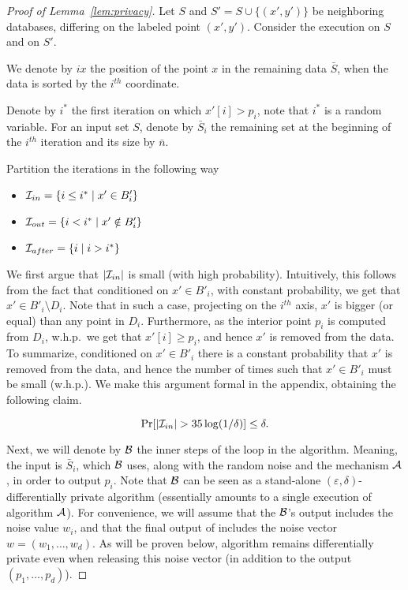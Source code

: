 \documentclass[12pt,a4paper,oneside,onecolumn]{book}
\begin{document}
\begin{proof}[Proof of Lemma~\ref{lem:privacy}]

  Let $S$ and $S'=S\cup\{(x',y')\}$ be neighboring databases, differing on the labeled point $(x',y')$. Consider the execution on $S$ and on $S'$.
  
We denote by $\num{i}{x}$ the position of the point $x$ in the remaining data $\bar{S}$,
when the data is sorted by the $i^{th}$ coordinate. 

Denote by $i^*$ the first iteration on which
$x'[i] > p_i$, note that $i^*$ is a random variable.
For an input set $S$, denote by $\bar{S}_i$
the remaining set at the beginning of the $i^{th}$ iteration
and 
its size by $\bar{n}$.

Partition the iterations in the following way 
\begin{itemize}[itemjoin={,\quad}]
\item $\mathcal{I}_{in} = \{i \leq i^*\mid x' \in B'_i\}$
\item $\mathcal{I}_{out} = \{i < i^* \mid x' \notin B'_i\}$  
\item $\mathcal{I}_{after} = \{i \mid i > i^*\}$
\end{itemize}



  

We first argue that $|\mathcal{I}_{in}|$ is small (with high probability). Intuitively, this follows from the fact that conditioned on $x'\in B'_i$, with constant probability, we get that $x'\in B'_i\setminus D_i$. Note that in such a case, projecting on the $i^{th}$ axis, $x'$ is bigger (or equal) than any point in $D_i$. Furthermore, as the interior point $p_i$ is computed from $D_i$, w.h.p.\ we get that $x'[i]\geq p_i$, and hence $x'$ is removed from the data. To summarize, conditioned on $x'\in B'_i$ there is a constant probability that $x'$ is removed from the data, and hence the number of times such that $x'\in B'_i$ must be small (w.h.p.). We make this argument formal in the appendix, obtaining the following claim.

\begin{claim}\label{claim:concentrate}
\[
\Pr[|\mathcal{I}_{in}| > 35 \log(1/\delta)]\leq \delta.
\]
\end{claim}



Next,
we will denote by $\mathcal{B}$ the inner steps of the loop in the algorithm.
Meaning, the input is $\bar{S}_i$,
which $\mathcal{B}$ uses, along with the random noise and the mechanism $\mathcal{A}$,
in order to output $p_i$.
Note that $\mathcal{B}$ can be seen as a stand-alone $(\varepsilon, \delta)$-differentially private algorithm (essentially amounts to a single execution of algorithm $\mathcal{A}$). 
For convenience, we will assume that the $\mathcal{B}$'s output includes the noise value $w_i$, and that the final output of  includes the noise vector $w=(w_1,\ldots,w_d)$. As will be proven below, algorithm  remains differentially private even when releasing this noise vector (in addition to the output $(p_1,\dots,p_d)$).


\end{proof}
\end{document}
